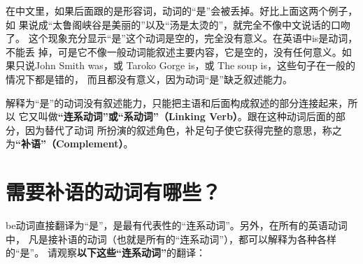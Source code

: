 在中文里，如果后面跟的是形容词，动词的“是”会被丢掉。好比上面这两个例子，如
果说成“太鲁阁峡谷是美丽的”以及“汤是太烫的”，就完全不像中文说话的口吻了。
这个现象充分显示“是”这个动词是空的，完全没有意义。在英语中is是动词，不能丢
掉，可是它不像一般动词能叙述主要内容，它是空的，没有任何意义。如果只说John
Smith was，或 Taroko Gorge is，或 The soup is，这些句子在一般的情况下都是错的，
而且都没有意义，因为动词“是”缺乏叙述能力。

解释为“是”的动词没有叙述能力，只能把主语和后面构成叙述的部分连接起来，所以
它又叫做\textbf{“连系动词”或“系动词”（Linking Verb）}。跟在这种动词后面的部分，因为替代了动词
所扮演的叙述角色，补足句子使它获得完整的意思，称之为\textbf{“补语”（Complement）}。

\section{需要补语的动词有哪些？}

be动词直接翻译为“是”，是最有代表性的“连系动词”。另外，在所有的英语动词中，
凡是接补语的动词（也就是所有的“连系动词”），都可以解释为各种各样的“是”。
请观察\textbf{以下这些“连系动词”}的翻译：

